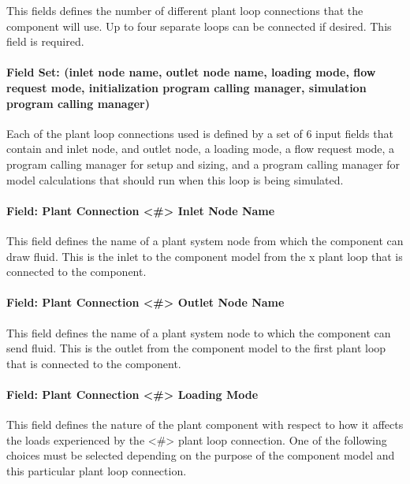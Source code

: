 This fields defines the number of different plant loop connections that the component will use. Up to four separate loops can be connected if desired. This field is required.

\paragraph{Field Set: (inlet node name, outlet node name, loading mode, flow request mode, initialization program calling manager, simulation program calling manager)}\label{feildset-inlet-node-name-outlet-node-name-loading-mode-flow-request-mode-initialization-program-calling-manager-simulation-program-calling-manager.}

Each of the plant loop connections used is defined by a set of 6 input fields that contain and inlet node, and outlet node, a loading mode, a flow request mode, a program calling manager for setup and sizing, and a program calling manager for model calculations that should run when this loop is being simulated.

\paragraph{Field: Plant Connection \textless{}\#\textgreater{} Inlet Node Name}\label{field-plant-connection-x-inlet-node-name}

This field defines the name of a plant system node from which the component can draw fluid. This is the inlet to the component model from the x plant loop that is connected to the component.

\paragraph{Field: Plant Connection \textless{}\#\textgreater{} Outlet Node Name}\label{field-plant-connection-x-outlet-node-name}

This field defines the name of a plant system node to which the component can send fluid. This is the outlet from the component model to the first plant loop that is connected to the component.

\paragraph{Field: Plant Connection \textless{}\#\textgreater{} Loading Mode}\label{field-plant-connection-x-loading-mode}

This field defines the nature of the plant component with respect to how it affects the loads experienced by the \textless{}\#\textgreater{} plant loop connection. One of the following choices must be selected depending on the purpose of the component model and this particular plant loop connection.

